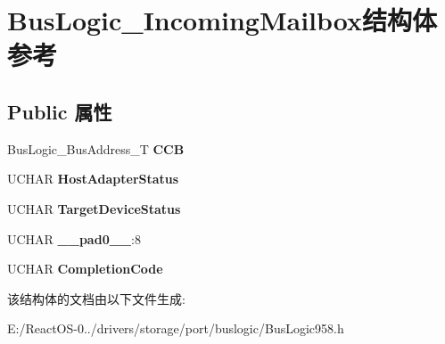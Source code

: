 \hypertarget{struct_bus_logic___incoming_mailbox}{}\section{Bus\+Logic\+\_\+\+Incoming\+Mailbox结构体 参考}
\label{struct_bus_logic___incoming_mailbox}
\subsection*{Public 属性}
\begin{DoxyCompactItemize}
\item 
\mbox{\label{struct_bus_logic___incoming_mailbox_a23a05fde61c2ccc20109094ef93e2637}} 
Bus\+Logic\+\_\+\+Bus\+Address\+\_\+T {\bfseries C\+CB}
\item 
\mbox{\label{struct_bus_logic___incoming_mailbox_a348e6fad4efa2d0eac6c97f45877b976}} 
U\+C\+H\+AR {\bfseries Host\+Adapter\+Status}
\item 
\mbox{\label{struct_bus_logic___incoming_mailbox_aa717f8654043c8c11eaee1e8f1bd76f8}} 
U\+C\+H\+AR {\bfseries Target\+Device\+Status}
\item 
\mbox{\label{struct_bus_logic___incoming_mailbox_aaee016b07a51e9f4ece46cdfcdbe3994}} 
U\+C\+H\+AR {\bfseries \+\_\+\+\_\+pad0\+\_\+\+\_\+}\+:8
\item 
\mbox{\label{struct_bus_logic___incoming_mailbox_a61ecd8204918cfb052b79b9681edad15}} 
U\+C\+H\+AR {\bfseries Completion\+Code}
\end{DoxyCompactItemize}


该结构体的文档由以下文件生成\+:\begin{DoxyCompactItemize}
\item 
E\+:/\+React\+O\+S-\/0../drivers/storage/port/buslogic/Bus\+Logic958.\+h\end{DoxyCompactItemize}
